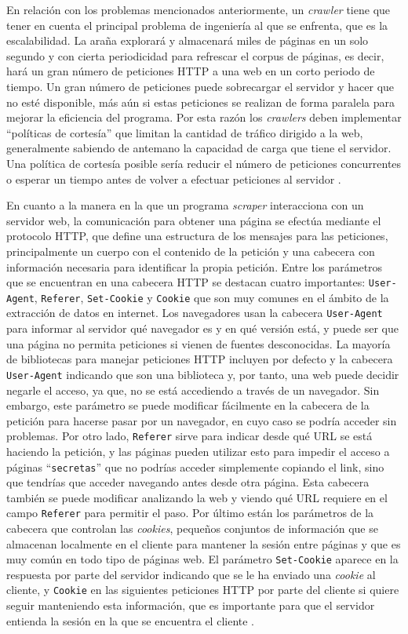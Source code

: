 En relación con los problemas mencionados anteriormente, un \textit{crawler}
tiene que tener en cuenta el principal problema de ingeniería al que se
enfrenta, que es la escalabilidad. La araña explorará y almacenará miles de
páginas en un solo segundo y con cierta periodicidad para refrescar el corpus de
páginas, es decir, hará un gran número de peticiones HTTP a una web en un corto
periodo de tiempo. Un gran número de peticiones puede sobrecargar el servidor y
hacer que no esté disponible, más aún si estas peticiones se realizan de forma
paralela para mejorar la eficiencia del programa. Por esta razón los
\textit{crawlers} deben implementar ``políticas de cortesía'' que limitan la
cantidad de tráfico dirigido a la web, generalmente sabiendo de antemano la
capacidad de carga que tiene el servidor. Una política de cortesía posible sería
reducir el número de peticiones concurrentes o esperar un tiempo antes de volver
a efectuar peticiones al servidor \cite{najork2009web}.

En cuanto a la manera en la que un programa \textit{scraper} interacciona con un
servidor web, la comunicación para obtener una página se efectúa mediante el
protocolo HTTP, que define una estructura de los mensajes para las peticiones,
principalmente un cuerpo con el contenido de la petición y una cabecera con
información necesaria para identificar la propia petición. Entre los parámetros
que se encuentran en una cabecera HTTP se destacan cuatro importantes:
\texttt{User-Agent}, \texttt{Referer}, \texttt{Set-Cookie} y \texttt{Cookie} que
son muy comunes en el ámbito de la extracción de datos en internet. Los
navegadores usan la cabecera \texttt{User-Agent} para informar al servidor qué
navegador es y en qué versión está, y puede ser que una página no permita
peticiones si vienen de fuentes desconocidas. La mayoría de bibliotecas para
manejar peticiones HTTP incluyen por defecto y la cabecera \texttt{User-Agent}
indicando que son una biblioteca y, por tanto, una web puede decidir negarle el
acceso, ya que, no se está accediendo a través de un navegador. Sin embargo,
este parámetro se puede modificar fácilmente en la cabecera de la petición para
hacerse pasar por un navegador, en cuyo caso se podría acceder sin problemas.
Por otro lado, \texttt{Referer} sirve para indicar desde qué URL se está
haciendo la petición, y las páginas pueden utilizar esto para impedir el acceso
a páginas ``\texttt{secretas}'' que no podrías acceder simplemente copiando el
link, sino que tendrías que acceder navegando antes desde otra página. Esta
cabecera también se puede modificar analizando la web y viendo qué URL requiere
en el campo \texttt{Referer} para permitir el paso. Por último están los
parámetros de la cabecera que controlan las \textit{cookies}, pequeños conjuntos
de información que se almacenan localmente en el cliente para mantener la sesión
entre páginas y que es muy común en todo tipo de páginas web. El parámetro \texttt{Set-Cookie} 
aparece en la respuesta por parte del servidor indicando que se le ha enviado
una \textit{cookie} al cliente, y \texttt{Cookie} en las siguientes peticiones
HTTP por parte del cliente si quiere seguir manteniendo esta información, que es
importante para que el servidor entienda la sesión en la que se encuentra el
cliente \cite{apress2018scraping}.

